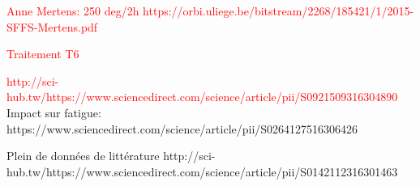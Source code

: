\textcolor{red}{Anne Mertens: 250 deg/2h
https://orbi.uliege.be/bitstream/2268/185421/1/2015-SFFS-Mertens.pdf}

\textcolor{red}{Traitement T6 \parencite{ABOULKHAIR2016139}}

\textcolor{red}{http://sci-hub.tw/https://www.sciencedirect.com/science/article/pii/S0921509316304890}\\

Impact sur fatigue:
https://www.sciencedirect.com/science/article/pii/S0264127516306426

Plein de données de littérature
http://sci-hub.tw/https://www.sciencedirect.com/science/article/pii/S0142112316301463
%
%
